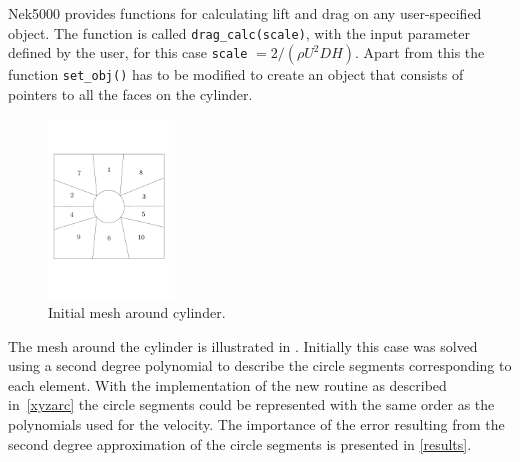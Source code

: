 Nek5000 provides functions for calculating lift and drag on any user-specified object.
The function is called \verb|drag_calc(scale)|, with the input parameter 
defined by the user, for this case \verb|scale| $=2/(\rho U^2DH)$.  
Apart from this the function \verb|set_obj()| has to be modified to create an object 
that consists of pointers to all the faces on the cylinder.
%
\begin{figure}[h]
    \centering
    \includegraphics[trim=0.5cm 4cm 0.5cm 4cm,width = 0.3\textwidth]{Figures/cyl_elem.pdf}
    \caption{Initial mesh around cylinder.}
    \label{fig:cyl_elem}
\end{figure}
%
The mesh around the cylinder is illustrated in .
Initially this case was solved using a second degree polynomial to describe the circle segments
corresponding to each element. With the implementation of the new routine as described 
in~\cref{xyzarc} the circle segments could be represented with the same order as 
the polynomials used for the velocity. The importance of the error resulting 
from the second degree approximation of the circle segments is presented in \cref{results}.

